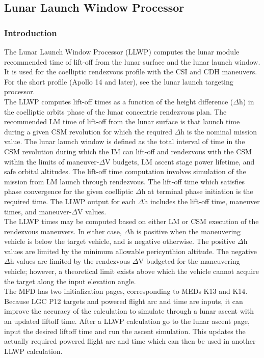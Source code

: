 \documentclass[11pt]{article} %
\begin{document}
\subsection{Lunar Launch Window Processor}
\subsubsection{Introduction}
The Lunar Launch Window Processor (LLWP) computes the lunar module recommended time of lift-off from the lunar surface and the lunar launch window. It is used for the coelliptic rendezvous profile with the CSI and CDH maneuvers. For the short profile (Apollo 14 and later), see the lunar launch targeting processor.\\

The LLWP computes lift-off times as a function of the height difference ($\Delta$h) in the coelliptic orbits phase of the lunar concentric rendezvous plan. The recommended LM time of lift-off from the lunar surface is that launch time during a given CSM revolution for which the required $\Delta$h is the nominal mission value. The lunar launch window is defined as the total interval of time in the CSM revolution during which the IM can lift-off and rendezvous with the CSM within the limits of maneuver-$\Delta$V budgets, LM ascent stage power lifetime, and safe orbital altitudes. The lift-off time computation involves simulation of the mission
from LM launch through rendezvous. The lift-off time which satisfies phase convergence for the given coelliptic $\Delta$h at terminal phase initiation is the required time. The LLWP output for each $\Delta$h includes the lift-off time, maneuver times, and maneuver-$\Delta$V values.\\

The LLWP times may be computed based on either LM or CSM execution of the rendezvous maneuvers. In either case, $\Delta$h is positive when the maneuvering vehicle is below the target vehicle, and is negative otherwise. The positive $\Delta$h values are limited by the minimum allowable pericynthion altitude. The negative $\Delta$h values are limited by the rendezvous $\Delta$V budgeted for the maneuvering vehicle; however, a theoretical limit exists above which the vehicle cannot acquire the target along the input elevation angle.\\

The MFD has two initialization pages, corresponding to MEDs K13 and K14. Because LGC P12 targets and powered flight arc and time are inputs, it can improve the accuracy of the calculation to simulate through a lunar ascent with an updated liftoff time. After a LLWP calculation go to the lunar ascent page, input the desired liftoff time and run the ascent simulation. This updates the actually required powered flight arc and time which can then be used in another LLWP calculation.\\
\newpage
\end{document}
